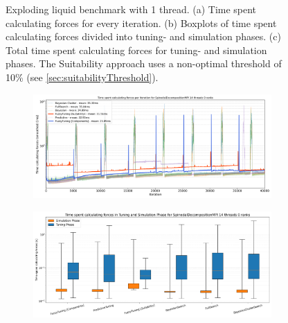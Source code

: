 \begin{figure}[H]
    \caption[Benchmark Results for the Exploding Liquid Scenario]{Exploding liquid benchmark with 1 thread. (a) Time spent calculating forces for every iteration. (b) Boxplots of time spent calculating forces divided into tuning- and simulation phases. (c) Total time spent calculating forces for tuning- and simulation phases. The Suitability approach uses a non-optimal threshold of 10\% (see \autoref{sec:suitabilityThreshold}).}
    \label{fig:explodingLiquid_1thread}
\end{figure}

\begin{figure}[H]
    \centering

    \begin{subfigure}[c]{\textwidth}
        \includegraphics[width=\columnwidth,trim={0cm 0.2cm 0cm 0.9cm},clip]{figures/Benchmark/SpinodalDecompositionMPI/SpinodalDecompositionMPI_timings_SpinodalDecompositionMPI_14_0.png}
        \caption{}
        \label{fig:spinodalTimings_14thread}
    \end{subfigure}


    \begin{subfigure}[c]{\textwidth}
        \includegraphics[width=\columnwidth,trim={0cm 0.5cm 0cm 1cm},clip]{figures/Benchmark/SpinodalDecompositionMPI/SpinodalDecompositionMPI_timings_boxplot_SpinodalDecompositionMPI_14_0.png}
        \caption{}
        \label{fig:spinodalBoxplot_14thread}
    \end{subfigure}


\end{figure}
